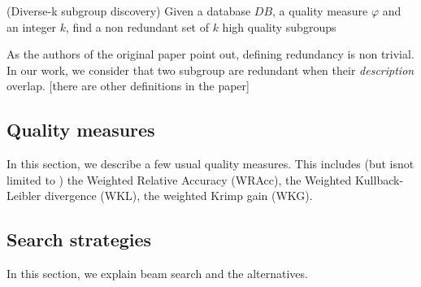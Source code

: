 \begin{problem}
    (Diverse-k subgroup discovery) Given a database $DB$, a quality measure
    $\varphi$ and an integer $k$, find a non redundant set of $k$ high quality subgroups
\end{problem}

As the authors of the original paper point out, defining redundancy 
is non trivial. In our work, we consider that two subgroup are redundant when
their \emph{description} overlap. [there are other definitions in the paper]

\subsection{Quality measures}
In this section, we describe a few usual quality measures. This includes (but
isnot limited to ) the Weighted Relative Accuracy (WRAcc), the Weighted
Kullback-Leibler divergence (WKL), the weighted Krimp gain (WKG).

\subsection{Search strategies}
In this section, we explain beam search and the alternatives.
